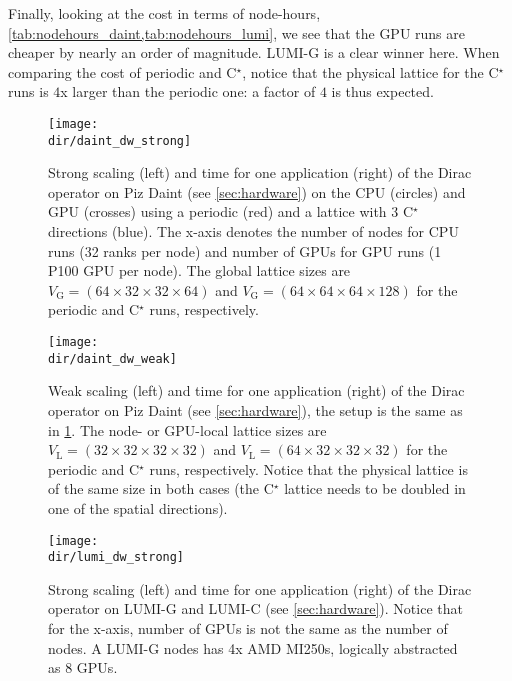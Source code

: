 Finally, looking at the cost in terms of node-hours, \cref{tab:nodehours_daint,tab:nodehours_lumi}, we see that the GPU runs are cheaper by nearly an order of magnitude. LUMI-G is a clear winner here. %
When comparing the cost of periodic and C$^\star$, notice that the physical lattice for the C$^\star$ runs is $4$x larger than the periodic one: a factor of $4$ is thus expected.

\begin{figure}
    \centering
    \texttt{[image: \\dir/daint\_dw\_strong]}
    \caption{Strong scaling (left) and time for one application (right) of the Dirac operator on Piz Daint (see \cref{sec:hardware}) on the CPU (circles) and GPU (crosses) using a periodic (red) and a lattice with 3 C$^\star$ directions (blue). The x-axis denotes the number of nodes for CPU runs (32 ranks per node) and number of GPUs for GPU runs (1 P100 GPU per node). The global lattice sizes are $V_\mathrm{G} = (64 \times 32 \times 32 \times 64)$ and $V_\mathrm{G} = (64 \times 64 \times 64 \times 128)$ for the periodic and C$^\star$ runs, respectively.}
    \label{fig:daint_dw_strong}
\end{figure}

\begin{figure}
    \centering
    \texttt{[image: \\dir/daint\_dw\_weak]}
    \caption{Weak scaling (left) and time for one application (right) of the Dirac operator on Piz Daint (see \cref{sec:hardware}), the setup is the same as in \cref{fig:daint_dw_strong}. The node- or GPU-local lattice sizes are $V_\mathrm{L} = (32 \times 32 \times 32 \times 32)$ and $V_\mathrm{L}= (64 \times 32 \times 32 \times 32)$ for the periodic and C$^\star$ runs, respectively. Notice that the physical lattice is of the same size in both cases (the C$^\star$ lattice needs to be doubled in one of the spatial directions).}
    \label{fig:daint_dw_weak}
\end{figure}

\begin{figure}
    \centering
    \texttt{[image: \\dir/lumi\_dw\_strong]}
    \caption{Strong scaling (left) and time for one application (right) of the Dirac operator on LUMI-G and LUMI-C (see \cref{sec:hardware}). Notice that for the x-axis, number of GPUs is not the same as the number of nodes. A LUMI-G nodes has 4x AMD MI250s, logically abstracted as 8 GPUs.}
    \label{fig:lumi_dw_strong}
\end{figure}

